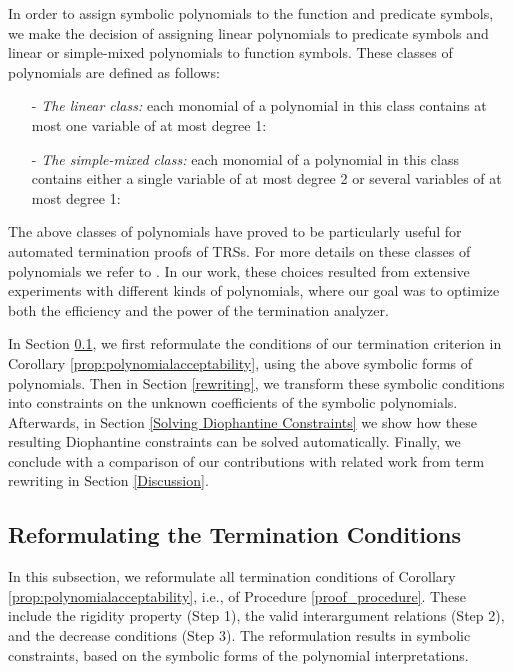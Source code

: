 \documentclass[envcountsame]{tlp}
\newcounter{ex:der-lastsymconsctr}
\begin{document}
In order to assign symbolic polynomials to the function and predicate symbols,
we make the decision of assigning linear polynomials to predicate symbols
and linear or simple-mixed polynomials to function symbols.
These classes of polynomials are defined as follows:
\begin{enumerate}
\item[-] \emph{The linear class:} each monomial of a polynomial in this class
contains at most one variable of at most degree 1:\\
  \vspace*{.2cm}
\item[-] \emph{The simple-mixed class:} each monomial of a polynomial in this
class contains either a single variable of at most degree 2 or several
variables of at most degree 1:\\ 

\end{enumerate}
The above classes of polynomials have proved to be particularly useful for
automated termination proofs of TRSs. 
For more details on these classes of polynomials we refer to
\cite{contejean05jar,Steinbach92}.
In our work, these choices resulted from extensive experiments
with different kinds of polynomials, where our goal was to optimize both the
efficiency and the power of the termination analyzer.








In Section \ref{Reformulating 
the Termination Conditions Symbolically}, we first reformulate the conditions
of our termination criterion in  Corollary
\ref{prop:polynomialacceptability}, using the above symbolic forms of
polynomials. Then in Section \ref{rewriting}, we transform these symbolic conditions
into constraints on the unknown coefficients of the symbolic polynomials. Afterwards, 
in Section \ref{Solving Diophantine Constraints} we show how these resulting
Diophantine constraints 
can be solved automatically. Finally, we conclude with a comparison of our
contributions with related work from term rewriting in Section \ref{Discussion}. 


\subsection{Reformulating the Termination Conditions}\label{Reformulating 
the Termination Conditions Symbolically}


In this subsection, we reformulate all termination conditions of Corollary
\ref{prop:polynomialacceptability}, i.e., of Procedure \ref{proof_procedure}. 
These include the rigidity property (Step 1),
the valid interargument relations (Step 2), and the
decrease conditions (Step 3). The reformulation results in
symbolic constraints, based on the
symbolic forms of the polynomial interpretations.
\end{document}

